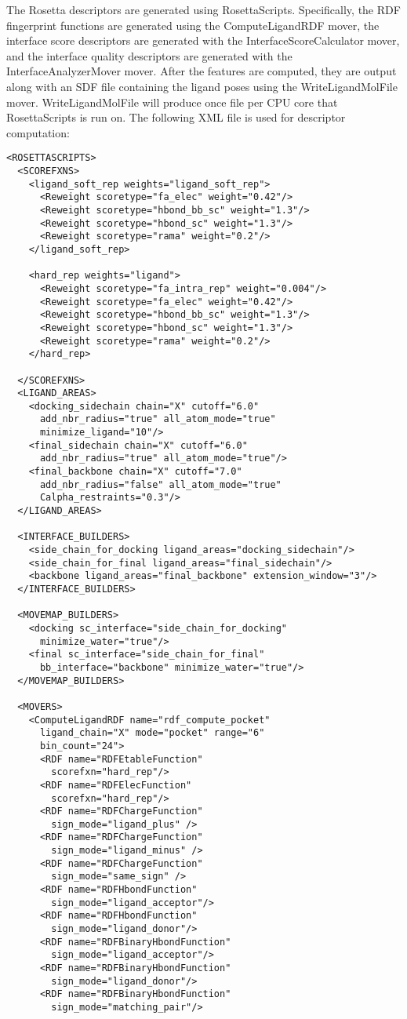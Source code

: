 The Rosetta descriptors are generated using RosettaScripts.
Specifically, the \ac{RDF} fingerprint functions are generated using the ComputeLigandRDF mover, the interface score descriptors are generated with the InterfaceScoreCalculator mover, and the interface quality descriptors are generated with the InterfaceAnalyzerMover mover. 
After the features are computed, they are output along with an \ac{SDF} file containing the ligand poses using the WriteLigandMolFile mover.
WriteLigandMolFile will produce once file per \ac{CPU} core that RosettaScripts is run on.
The following \ac{XML} file is used for descriptor computation:
\singlespace
\begin{verbatim}
<ROSETTASCRIPTS>
  <SCOREFXNS>
    <ligand_soft_rep weights="ligand_soft_rep">
      <Reweight scoretype="fa_elec" weight="0.42"/>
      <Reweight scoretype="hbond_bb_sc" weight="1.3"/>
      <Reweight scoretype="hbond_sc" weight="1.3"/>
      <Reweight scoretype="rama" weight="0.2"/>
    </ligand_soft_rep>
  
    <hard_rep weights="ligand">
      <Reweight scoretype="fa_intra_rep" weight="0.004"/>
      <Reweight scoretype="fa_elec" weight="0.42"/>
      <Reweight scoretype="hbond_bb_sc" weight="1.3"/>
      <Reweight scoretype="hbond_sc" weight="1.3"/>
      <Reweight scoretype="rama" weight="0.2"/>
    </hard_rep>
    
  </SCOREFXNS>
  <LIGAND_AREAS>
    <docking_sidechain chain="X" cutoff="6.0"
      add_nbr_radius="true" all_atom_mode="true"
      minimize_ligand="10"/>
    <final_sidechain chain="X" cutoff="6.0"
      add_nbr_radius="true" all_atom_mode="true"/>
    <final_backbone chain="X" cutoff="7.0"
      add_nbr_radius="false" all_atom_mode="true" 
      Calpha_restraints="0.3"/>
  </LIGAND_AREAS>
  
  <INTERFACE_BUILDERS>
    <side_chain_for_docking ligand_areas="docking_sidechain"/>
    <side_chain_for_final ligand_areas="final_sidechain"/>
    <backbone ligand_areas="final_backbone" extension_window="3"/>
  </INTERFACE_BUILDERS>
  
  <MOVEMAP_BUILDERS>
    <docking sc_interface="side_chain_for_docking"
      minimize_water="true"/>
    <final sc_interface="side_chain_for_final"
      bb_interface="backbone" minimize_water="true"/>
  </MOVEMAP_BUILDERS>
  
  <MOVERS>
    <ComputeLigandRDF name="rdf_compute_pocket" 
      ligand_chain="X" mode="pocket" range="6"
      bin_count="24">
      <RDF name="RDFEtableFunction"
        scorefxn="hard_rep"/>
      <RDF name="RDFElecFunction"
        scorefxn="hard_rep"/>
      <RDF name="RDFChargeFunction"
        sign_mode="ligand_plus" />
      <RDF name="RDFChargeFunction"
        sign_mode="ligand_minus" />
      <RDF name="RDFChargeFunction"
        sign_mode="same_sign" />
      <RDF name="RDFHbondFunction"
        sign_mode="ligand_acceptor"/>
      <RDF name="RDFHbondFunction"
        sign_mode="ligand_donor"/> 
      <RDF name="RDFBinaryHbondFunction"
        sign_mode="ligand_acceptor"/>
      <RDF name="RDFBinaryHbondFunction"
        sign_mode="ligand_donor"/>
      <RDF name="RDFBinaryHbondFunction"
        sign_mode="matching_pair"/>      


\end{verbatim}
